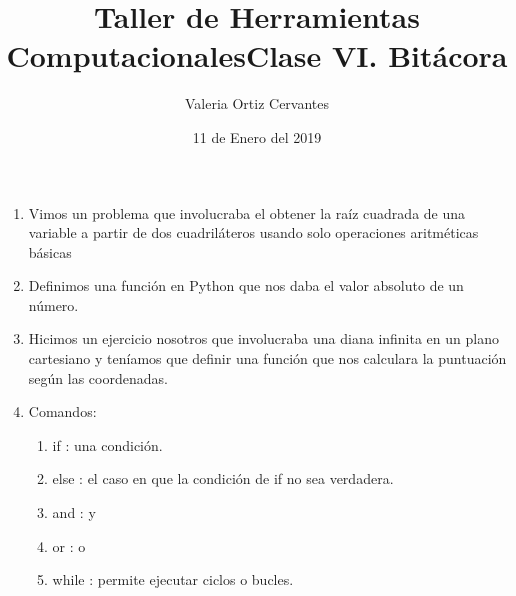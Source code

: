\documentclass[letterpaper, 12pt, oneside]{article} %
\title{\Huge Taller de Herramientas Computacionales}
\author{Valeria Ortiz Cervantes}
\date{11 de Enero del 2019}
\begin{document}
	\maketitle
	\newpage
	\title{Clase VI. Bitácora\\}
	\begin{enumerate}
		\item Vimos un problema que involucraba el obtener la raíz cuadrada de una variable a partir de dos cuadriláteros usando solo operaciones aritméticas básicas
		\item Definimos una función en Python que nos daba el valor absoluto de un número.
		\item Hicimos un ejercicio nosotros que involucraba una diana infinita en un plano cartesiano y teníamos que definir una función que nos calculara la puntuación según las coordenadas.
		\item Comandos:
		\begin{enumerate}
			\item if : una condición.
			\item else : el caso en que la condición de if no sea verdadera.
			\item and : y
			\item or : o
			\item while : permite ejecutar ciclos o bucles.
		\end{enumerate} 
	\end{enumerate}
\end{document}

